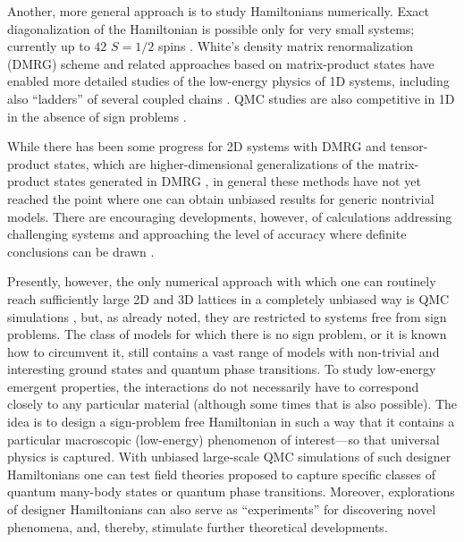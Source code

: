 \documentclass[range]{ar2e}
\begin{document}
Another, more general approach is to study Hamiltonians numerically. Exact diagonalization of the Hamiltonian is possible 
only for very small systems; currently up to $42$ $S=1/2$ spins \cite{Nakano11,Lauchli11}. White's density matrix 
renormalization (DMRG) scheme \cite{White92} and related approaches based on matrix-product states \cite{Schollwock05} 
have enabled more detailed studies of the low-energy physics of 1D systems, including also ``ladders'' of several coupled chains
\cite{Dagotto96}. QMC studies are also competitive in 1D in the absence of sign problems \cite{Sandvik04,Jeckelmann02,Mund09}.

While there has been some progress for 2D systems with DMRG \cite{Stoudenmire12} and tensor-product \cite{Murg09,Gu08,Xie09} states, which are
higher-dimensional generalizations of the  matrix-product states generated in DMRG \cite{Rommer97}, in general these methods have not yet reached the point 
where one  can obtain unbiased results for generic nontrivial models. There are encouraging developments, however, of calculations addressing challenging systems and 
approaching the level of accuracy where definite conclusions can be drawn \cite{Yan11,Bauer12}.

Presently, however, the only numerical approach with which one can routinely reach sufficiently large 2D and 3D lattices in a completely unbiased way 
is QMC simulations \cite{Evertz03,Sandvik10b}, but, as already noted, they are restricted to systems free from sign problems. The class of models 
for which there is no sign problem, or it is known how to circumvent it, still contains a vast range of models with non-trivial 
and interesting ground states and quantum phase transitions. To study low-energy emergent 
properties, the interactions do not necessarily have to correspond closely to any particular material (although some 
times that is also possible). The idea is to design a sign-problem free Hamiltonian in such a way that it contains a 
particular macroscopic (low-energy) phenomenon of interest---so that universal physics is captured. With unbiased large-scale 
QMC simulations of such designer Hamiltonians one can test field theories proposed to capture specific classes of quantum many-body 
states or quantum phase transitions. Moreover, explorations of designer Hamiltonians can also serve as ``experiments'' for 
discovering novel phenomena, and, thereby, stimulate further theoretical developments.
\end{document}
